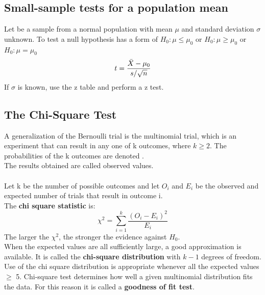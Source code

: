 \documentclass[../main.tex]{subfiles}
\begin{document}
\subsection{Small-sample tests for a population mean}
Let \xotn be a sample from a normal population with mean $\mu$ and standard deviation $\sigma$ unknown.
To test a null hypothesis has a form of $H_0:\mu\leq\mu_0$ or $H_0:\mu\geq\mu_0$ or $H_0:\mu=\mu_0$\\
\[t= \frac{\bar{X} - \mu_0}{s/{\sqrt{n}}}\]
If $\sigma$ is known, use the z table and perform a z test.

\subsection{The Chi-Square Test}
A generalization of the Bernoulli trial is the multinomial trial, which is an experiment that can result in any one of k outcomes, where $k \geq 2$. The probabilities of the k outcomes are denoted \potk.\\
The results obtained are called observed values.\\
\\
Let k be the number of possible outcomes and let $O_i$ and $E_i$ be the observed and expected number of trials that result in outcome i.\\
The \textbf{chi square statistic} is:
\begin{equation*}
    \chi ^2 = \sum_{i=1}^{k} \frac{(O_i - E_i)^2}{E_i}
\end{equation*}
The larger the $\chi ^2$, the stronger the evidence against $H_0$.\\
When the expected values are all sufficiently large, a good approximation is available. It is called the \textbf{chi-square distribution} with $k-1$ degrees of freedom.\\
Use of the chi square distribution is appropriate whenever all the expected values $\geq$ 5.
Chi-square test determines how well a given multinomial distribution fits the data. For this reason it is called a \textbf{goodness of fit test}.
\end{document}
